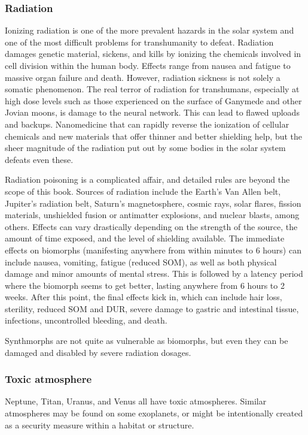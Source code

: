\subsubsection{Radiation} 

Ionizing radiation is one of the more prevalent hazards in the solar system and one of the most difficult problems for transhumanity to defeat. Radiation damages genetic material, sickens, and kills by ionizing the chemicals involved in cell division within the human body. Effects range from nausea and fatigue to massive organ failure and death. However, radiation sickness is not solely a somatic phenomenon. The real terror of radiation for transhumans, especially at high dose levels such as those experienced on the surface of Ganymede and other Jovian moons, is damage to the neural network. This can lead to flawed uploads and backups. Nanomedicine that can rapidly reverse the ionization of cellular chemicals and new materials that offer thinner and better shielding help, but the sheer magnitude of the radiation put out by some bodies in the solar system defeats even these. 

Radiation poisoning is a complicated affair, and detailed rules are beyond the scope of this book. Sources of radiation include the Earth’s Van Allen belt, Jupiter’s radiation belt, Saturn’s magnetosphere, cosmic rays, solar flares, fission materials, unshielded fusion or antimatter explosions, and nuclear blasts, among others. Effects can vary drastically depending on the strength of the source, the amount of time exposed, and the level of shielding available. The immediate effects on biomorphs (manifesting anywhere from within minutes to 6 hours) can include nausea, vomiting, fatigue (reduced SOM), as well as both physical damage and minor amounts of mental stress. This is followed by a latency period where the biomorph seems to get better, lasting anywhere from 6 hours to 2 weeks. After this point, the final effects kick in, which can include hair loss, sterility, reduced SOM and DUR, severe damage to gastric and intestinal tissue, infections, uncontrolled bleeding, and death. 

Synthmorphs are not quite as vulnerable as biomorphs, but even they can be damaged and disabled by severe radiation dosages. 

\subsubsection{Toxic atmosphere} 

Neptune, Titan, Uranus, and Venus all have toxic atmospheres. Similar atmospheres may be found on some exoplanets, or might be intentionally created as a security measure within a habitat or structure. 

